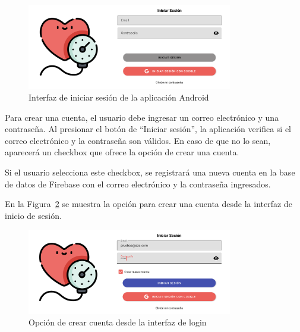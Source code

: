     \begin{figure}[H]
        \centering
        \includegraphics[width=0.8\textwidth]{img/Resultados/android_login.png}
        \caption[Interfaz de iniciar sesión de la aplicación Android.]{Interfaz de iniciar sesión de la aplicación Android\footnotemark}
        \label{fig:Android_Login}
    \end{figure}

    Para crear una cuenta, el usuario debe ingresar un correo electrónico y una contraseña. Al presionar el botón de ``Iniciar sesión'', la aplicación verifica si el correo electrónico y la contraseña son válidos. En caso de que no lo sean, aparecerá un checkbox que ofrece la opción de crear una cuenta. 

    Si el usuario selecciona este checkbox, se registrará una nueva cuenta en la base de datos de Firebase con el correo electrónico y la contraseña ingresados.

    En la Figura~\ref{fig:Android_CrearCuenta} se muestra la opción para crear una cuenta desde la interfaz de inicio de sesión.

    \begin{figure}[H]
        \centering
        \includegraphics[width=0.8\textwidth]{img/Resultados/android_crearCuenta.png}
        \caption[Opción de crear cuenta desde la interfaz de login.]{Opción de crear cuenta desde la interfaz de login\footnotemark}
        \label{fig:Android_CrearCuenta}
    \end{figure}

